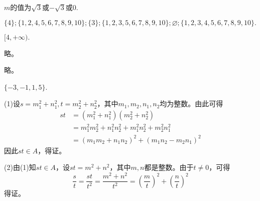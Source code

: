 \documentclass[lang=cn,newtx,10pt,scheme=chinese]{elegantbook}
\begin{document}
\begin{exercise}
  $m$的值为$\sqrt{3}$或$-\sqrt{3}$或$0$.
\end{exercise}
\begin{exercise}
  $\{4\};\{1,2,4,5,6,7,8,9,10\};\{3\};\{1,2,3,5,6,7,8,9,10\};\varnothing ;\{1,2,3,4,5,6,7,8,9,10\}.$
\end{exercise}
\begin{exercise}
  $[4,+\infty).$
\end{exercise}
\begin{exercise}
  略。
\end{exercise}
\begin{exercise}
  略。
\end{exercise}
\begin{exercise}
  $\{-3,-1,1,5\}$.
\end{exercise}
\begin{exercise}
  (1)设$s=m_1^2+n_1^2,t=m_2^2+n_2^2$，其中$m_1,m_2,n_1,n_2$均为整数。由此可得
  $$\begin{aligned}
    st& =(m_1^2+n_1^2)(m_2^2+n_2^2)  \\
    &=m_1^2m_2^2+n_1^2n_2^2+m_1^2n_2^2+m_2^2n_1^2 \\
    &=(m_1m_2+n_1n_2)^2+(m_1n_2-m_2n_1)^2
    \end{aligned}$$
  因此$st\in A$，得证。
  
  (2)由(1)知$st \in A$，设$st=m^2+n^2$，其中$m,n$都是整数。由于$t\neq 0$，可得$$\frac st=\frac{st}{t^2}=\frac{m^2+n^2}{t^2}=\left(\frac mt\right)^2+\left(\frac nt\right)^2$$
  得证。
\end{exercise}
\end{document}
